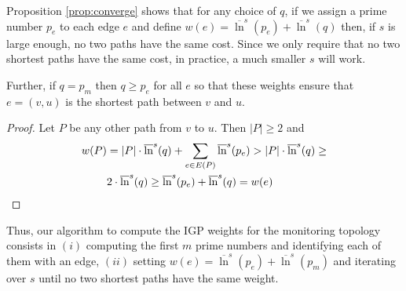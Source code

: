 Proposition \ref{prop:converge} shows that for any choice of $q$, if we assign a prime number $p_e$ to each edge 
$e$ and define $w(e) = \overline{\ln}^s(p_e) + \overline{\ln}^s(q)$ then, if $s$ is
large enough, no two paths have the same cost. Since we only require that no two 
shortest paths have the same cost, in practice, a much smaller $s$ will work.

Further, if $q = p_m$ then $q \geq p_e$ for all $e$ so that these weights ensure that $e = (v, u)$ is the shortest path between $v$ and $u$.
\begin{proof}
Let $P$ be any other path from $v$ to $u$. Then $|P| \geq 2$ and
\begin{align*}
\tiny
w(P) & = |P| \cdot \overline{\ln}^s(q) + \sum_{e \in E(P)} \overline{\ln}^s(p_e) > |P| \cdot \overline{\ln}^s(q) \geq \\
& 2 \cdot \overline{\ln}^s(q) \geq \overline{\ln}^s(p_e) + \overline{\ln}^s(q) = w(e)
\end{align*}
\end{proof}

Thus, our algorithm to compute the IGP weights for the monitoring topology
consists in $(i)$ computing the first $m$ prime numbers and identifying each
of them with an edge, $(ii)$ setting $w(e) = \overline{\ln}^s(p_e) + \overline{\ln}^s(p_m)$ and
iterating over $s$ until no two shortest paths have the same weight.

